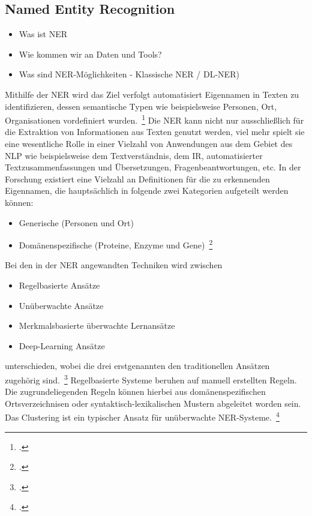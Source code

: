 \subsection{Named Entity Recognition} \label{NER}

\begin{itemize}
    \item Was ist NER
    \item Wie kommen wir an Daten und Tools?
    \item Was sind NER-Möglichkeiten - Klassische NER / DL-NER)
\end{itemize}
Mithilfe der \ac{NER} wird das Ziel verfolgt automatisiert Eigennamen in Texten zu identifizieren,
dessen semantische Typen wie beispielsweise Personen, Ort, Organisationen vordefiniert wurden.~\footcite[\vglf]
[]{nadeau.2007}
Die \ac{NER} kann nicht nur ausschließlich für die Extraktion von Informationen aus Texten genutzt werden, viel mehr
spielt sie eine wesentliche Rolle in einer Vielzahl von Anwendungen aus dem Gebiet des \ac{NLP} wie beispielsweise dem
Textverständnis, dem \ac{IR}, automatisierter Textzusammenfassungen und Übersetzungen, Fragenbeantwortungen, etc.
In der Forschung existiert eine Vielzahl an Definitionen für die zu erkennenden Eigennamen, die hauptsächlich in
folgende zwei Kategorien aufgeteilt werden können:
\begin{itemize}
    \item Generische (\zb Personen und Ort)
    \item Domänenspezifische (\zb Proteine, Enzyme und Gene)~\footcite[\vglf][]{li.2020}
\end{itemize}
Bei den in der \ac{NER} angewandten Techniken wird zwischen
\begin{itemize}
    \item Regelbasierte Ansätze
    \item Unüberwachte Ansätze
    \item Merkmalsbasierte überwachte Lernansätze
    \item Deep-Learning Ansätze
\end{itemize}
unterschieden, wobei die drei erstgenannten den traditionellen Ansätzen zugehörig sind.~\footcite[\vglf][]
{li.2020}
Regelbasierte Systeme beruhen auf manuell erstellten Regeln.
Die zugrundeliegenden Regeln können hierbei \zb aus domänenspezifischen Ortsverzeichnisen oder syntaktisch-lexikalischen
Mustern abgeleitet worden sein.\newline
Das Clustering ist ein typischer Ansatz für unüberwachte \ac{NER}-Systeme.~\footcite[\vglf][ f.]{nadeau.2007}
